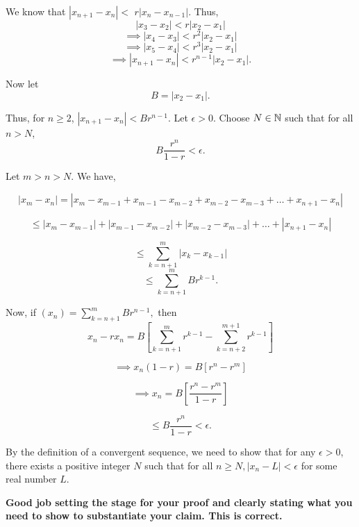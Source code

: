 \documentclass{report}
\begin{document}
\bigskip

\pagebreak
{}

\begin{myproof}
We know that $\left|x_{n+1}-x_n\right|<$ $r\left|x_n-x_{n-1}\right|.$ Thus, $$\left|x_{3}-x_2\right|< r\left|x_2-x_{1}\right|$$
$$ \implies \left|x_{4}-x_3\right|< r^2\left|x_2-x_{1}\right|$$
$$ \implies \left|x_{5}-x_4\right|< r^3\left|x_2-x_{1}\right|$$
$$ \implies \left|x_{n+1}-x_n\right|< r^{n-1}\left|x_2-x_{1}\right|.$$


Now let 
$$B=\left|x_{2}-x_1\right|.$$

Thus, for $n \geq 2$, $|x_{n+1}-x_n|< Br^{n-1}.$ Let $\epsilon > 0.$ Choose $N\in\NN$ such that for all $n > N$, $$B\frac{ r^{n}}{1-r} < \epsilon.$$

Let $m > n > N.$ We have,

$$|x_m - x_n|= |x_m - x_{m-1} + x_{m-1} - x_{m-2}  + x_{m-2} - x_{m-3}+ \dots+ x_{n+1} -  x_{n}| $$

$$\leq |x_m - x_{m-1}| + |x_{m-1} - x_{m-2}|  + 
|x_{m-2} -  x_{m-3}| + \dots + | x_{n+1} -  x_{n}| $$

$$ \leq \sum_{k={n+1}}^m |x_k - x_{k-1}|$$
$$ \leq \sum_{k={n+1}}^{m}B r^{k-1}.$$


Now, if $(x_n)= \sum_{k={n+1}}^{m}Br^{n-1}, $ then
$$x_n - rx_n = B\left[\sum_{k={n+1}}^{m}r^{k-1} - \sum_{k={n+2}}^{m+1}r^{k-1}\right]$$

$$\implies x_n(1 - r) = B\left[r^n - r^{m}\right] $$

$$\implies x_n = B\left[\frac{r^n - r^{m}}{1 - r}\right] $$

$$\leq B\frac{r^n}{1 - r}  < \epsilon.$$

\end{myproof}
\pagebreak

By the definition of a convergent sequence, we need to show that for any $\epsilon>0$, there exists a positive integer $N$ such that for all $n \geq N,\left|x_n-L\right|<\epsilon$ for some real number $L$.

\textbf{Good job setting the stage for your proof and clearly stating what you need to show to substantiate your claim. This is correct.}
\end{document}

